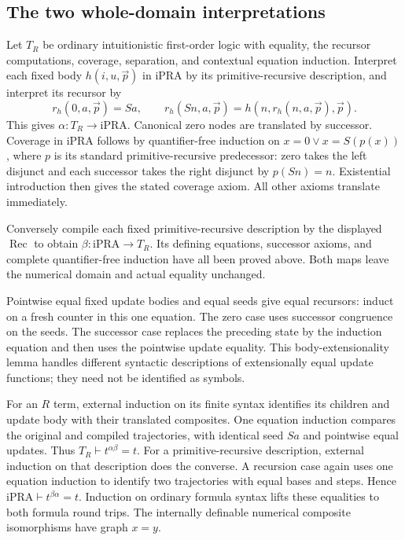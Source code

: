 \subsection{The two whole-domain interpretations}

Let $T_R$ be ordinary intuitionistic first-order logic with equality,
the recursor computations, coverage, separation, and contextual equation
induction. Interpret each fixed body $h(i,u,\vec p)$ in iPRA by its
primitive-recursive description, and interpret its recursor by
\[
 r_h(0,a,\vec p)=Sa,\qquad
 r_h(Sn,a,\vec p)=h(n,r_h(n,a,\vec p),\vec p).
\]
This gives $\alpha:T_R\to\mathrm{iPRA}$. Canonical zero nodes are
translated by successor. Coverage in iPRA follows by quantifier-free
induction on $x=0\lor x=S(p(x))$, where $p$ is its standard
primitive-recursive predecessor: zero takes the left disjunct and each
successor takes the right disjunct by $p(Sn)=n$. Existential introduction
then gives the stated coverage axiom. All other axioms translate immediately.

Conversely compile each fixed primitive-recursive description by the
displayed $\operatorname{Rec}$ to obtain
$\beta:\mathrm{iPRA}\to T_R$. Its defining equations, successor axioms,
and complete quantifier-free induction have all been proved above.
Both maps leave the numerical domain and actual equality unchanged.

Pointwise equal fixed update bodies and equal seeds give equal recursors:
induct on a fresh counter in this one equation. The zero case uses
successor congruence on the seeds. The successor case replaces the preceding
state by the induction equation and then uses the pointwise update equality.
This body-extensionality lemma handles different syntactic descriptions of
extensionally equal update functions; they need not be identified as symbols.

For an $R$ term, external induction on its finite syntax identifies its
children and update body with their translated composites. One equation
induction compares the original and compiled trajectories, with identical
seed $Sa$ and pointwise equal updates. Thus $T_R\vdash t^{\alpha\beta}=t$.
For a primitive-recursive description, external induction on that description
does the converse. A recursion case again uses one equation induction to
identify two trajectories with equal bases and steps. Hence
$\mathrm{iPRA}\vdash t^{\beta\alpha}=t$.
Induction on ordinary formula syntax lifts these equalities to both formula
round trips. The internally definable numerical composite isomorphisms have
graph $x=y$.

